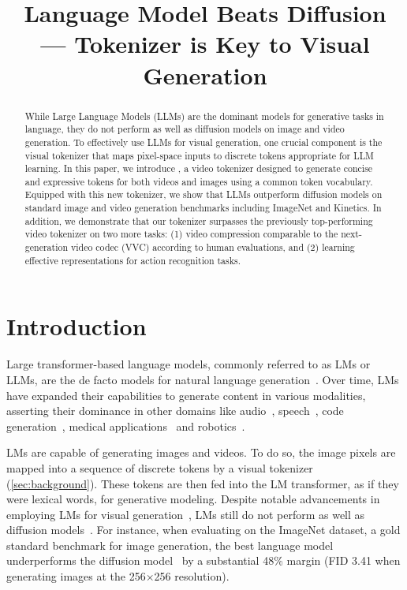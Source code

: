 \title{Language Model Beats Diffusion\\---  Tokenizer is Key to Visual Generation}



\maketitle
\vspace{-3mm}
\begin{abstract}
\vspace{-3mm}
While Large Language Models (LLMs) are the dominant models for generative tasks in language, they do not perform as well as diffusion models on image and video generation.
To effectively use LLMs for visual generation, one crucial component is the visual tokenizer that maps pixel-space inputs to discrete tokens appropriate for LLM learning.
In this paper, we introduce \modelname{}, a video tokenizer designed to generate concise and expressive tokens for both videos and images using a common token vocabulary.
Equipped with this new tokenizer, we show that LLMs outperform diffusion models on standard image and video generation benchmarks including ImageNet and Kinetics. 
In addition, we demonstrate that our tokenizer surpasses the previously top-performing video tokenizer on two more tasks: (1) video compression comparable to the next-generation video codec (VVC) according to human evaluations, and (2) learning effective representations for action recognition tasks.
\end{abstract}

\vspace{-4mm}
\section{Introduction}
\vspace{-2mm}

Large transformer-based language models, commonly referred to as LMs or LLMs, are the de facto models for natural language generation~\citep{openai2023gpt4,googlepalm2,touvron2023llama}. Over time, LMs have expanded their capabilities to generate content in various modalities, asserting their dominance in other domains like audio~\citep{agostinelli2023musiclm}, speech~\citep{rubenstein2023audiopalm}, code generation~\citep{li2023starcoder}, medical applications~\citep{singhal2023towards} and robotics~\citep{brohan2023rt}.

LMs are capable of generating images and videos. To do so, the image pixels are mapped into a sequence of discrete tokens by a visual tokenizer (\cf \cref{sec:background}). These tokens are then fed into the LM transformer, as if they were lexical words, for generative modeling. Despite notable advancements in employing LMs for visual generation~\citep{esser2021taming,chang2022maskgit}, LMs still do not perform as well as diffusion models~\citep{rombach2022high}.
For instance, when evaluating on the ImageNet dataset, a gold standard benchmark for image generation, the best language model~\citep{lee2022draft} underperforms 
the diffusion model~\citep{gao2023masked} by a substantial 48\% margin (FID 3.41  when generating images at the 256$\times$256 resolution).

